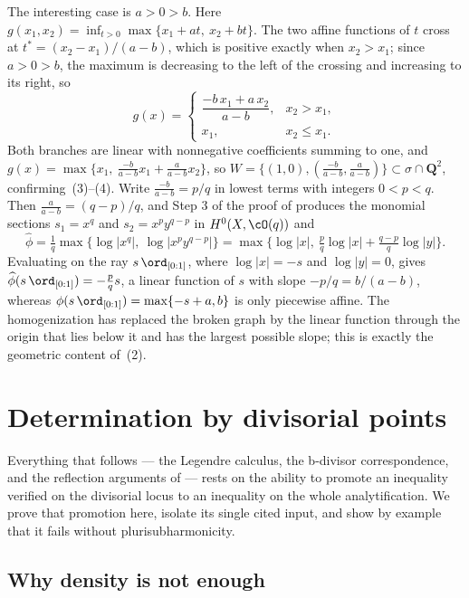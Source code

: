 \begin{example}
The interesting case is $a>0>b$.  Here
$g(x_1,x_2)=\inf_{t>0}\max\{x_1+at,\ x_2+bt\}$.  The two affine functions
of $t$ cross at $t^*=(x_2-x_1)/(a-b)$, which is positive exactly when
$x_2>x_1$; since $a>0>b$, the maximum is decreasing to the left of the
crossing and increasing to its right, so
\[
 g(x)=
 \begin{cases}
  \dfrac{-b\,x_1+a\,x_2}{a-b},&x_2>x_1,\\[2mm]
  x_1,&x_2\leq x_1 .
 \end{cases}
\]
Both branches are linear with nonnegative coefficients summing to one, and
$g(x)=\max\bigl\{x_1,\ \tfrac{-b}{a-b}x_1+\tfrac{a}{a-b}x_2\bigr\}$, so
$W=\{(1,0),(\tfrac{-b}{a-b},\tfrac{a}{a-b})\}\subset\sigma\cap\mathbf Q^2$,
confirming \,(3)--(4).  Write
$\tfrac{-b}{a-b}=p/q$ in lowest terms with integers $0<p<q$.
Then $\tfrac a{a-b}=(q-p)/q$, and Step 3 of the proof of
 produces the monomial sections
$s_1=x^q$ and $s_2=x^{p}y^{q-p}$ in $H^0(X,\cO(q))$ and
\[
 \widehat\phi=\tfrac1q\max\{\log|x^q|,\ \log|x^py^{q-p}|\}
 =\max\bigl\{\log|x|,\ \tfrac pq\log|x|+\tfrac{q-p}q\log|y|\bigr\}.
\]
Evaluating on the ray $s\,\ord_{[0:1]}$, where $\log|x|=-s$ and
$\log|y|=0$, gives $\widehat\phi(s\,\ord_{[0:1]})=-\tfrac pqs$, a linear
function of $s$ with slope $-p/q=b/(a-b)$, whereas
$\phi(s\,\ord_{[0:1]})=\max\{-s+a,b\}$ is only piecewise affine.  The
homogenization has replaced the broken graph by the linear function through
the origin that lies below it and has the largest possible slope; this is
exactly the geometric content of
\,(2).
\end{example}

\section{Determination by divisorial points}
\label{sec:ch35-determination}

Everything that follows --- the Legendre calculus, the b-divisor
correspondence, and the reflection arguments of
 --- rests on the ability to promote an inequality
verified on the divisorial locus to an inequality on the whole
analytification.  We prove that promotion here, isolate its single cited
input, and show by example that it fails without plurisubharmonicity.

\subsection{Why density is not enough}
\label{sec:ch35-density-insufficient}

